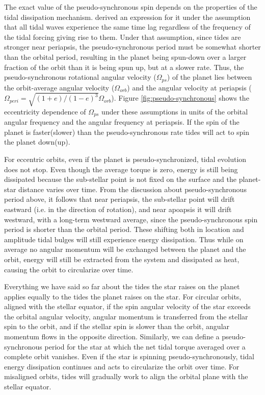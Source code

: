 The exact value of the pseudo-synchronous spin depends on the properties of the
tidal dissipation mechanism. \citep{Hut_81} derived an expression for it under
the assumption that all tidal waves experience the same time lag regardless of
the frequency of the tidal forcing giving rise to them. Under that assumption,
since tides are stronger near periapsis, the pseudo-synchronous period must be
somewhat shorter than the orbital period, resulting in the planet being
spun-down over a larger fraction of the orbit than it is being spun up, but at a
slower rate. Thus, the \citet{Hut_81} pseudo-synchronous rotational angular
velocity ($\Omega_{ps}$) of the planet lies between the orbit-average angular
velocity ($\Omega_{orb}$) and the angular velocity at periapsis ($\Omega_{peri}
= \sqrt{(1+e)/(1-e)^3}\Omega_{orb}$). Figure \ref{fig:pseudo-synchronous} shows
the eccentricity dependence of $\Omega_{ps}$ under these assumptions in units of
the orbital angular frequency and the angular frequency at periapsis. If the
spin of the planet is faster(slower) than the pseudo-synchronous rate tides will
act to spin the planet down(up).

For eccentric orbits, even if the planet is pseudo-synchronized, tidal evolution
does not stop. Even though the average torque is zero, energy is still being
dissipated because the sub-stellar point is not fixed on the surface and the
planet-star distance varies over time. From the discussion about
pseudo-synchronous period above, it follows that near periapsis, the sub-stellar
point will drift eastward (i.e. in the direction of rotation), and near apoapsis
it will drift westward, with a long-term westward average, since the
pseudo-synchronous spin period is shorter than the orbital period. These
shifting both in location and amplitude tidal bulges will still experience
energy dissipation. Thus while on average no angular momentum will be exchanged
between the planet and the orbit, energy will still be extracted from the system
and dissipated as heat, causing the orbit to circularize over time.

Everything we have said so far about the tides the star raises on the planet
applies equally to the tides the planet raises on the star. For circular orbits,
aligned with the stellar equator, if the spin angular velocity of the star
exceeds the orbital angular velocity, angular momentum is transferred from the
stellar spin to the orbit, and if the stellar spin is slower than the orbit,
angular momentum flows in the opposite direction. Similarly, we can define a
pseudo-synchronous period for the star at which the net tidal torque averaged
over a complete orbit vanishes. Even if the star is spinning
pseudo-synchronously, tidal energy dissipation continues and acts to circularize
the orbit over time. For misaligned orbits, tides will gradually work to align
the orbital plane with the stellar equator.


